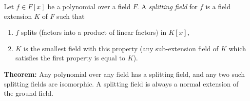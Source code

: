 \documentclass{article}
\begin{document}
Let $f \in F[x]$ be a polynomial over a field $F$. A {\em splitting field} for $f$ is a field extension $K$ of $F$ such that
\begin{enumerate}
\item $f$ splits (factors into a product of linear factors) in $K[x]$,
\item $K$ is the smallest field with this property (any sub-extension field of $K$ which satisfies the first property is equal to $K$).
\end{enumerate}
{\bf Theorem:} Any polynomial over any field has a splitting field, and any two such splitting fields are isomorphic. A splitting field is always a normal extension of the ground field.
\end{document}
